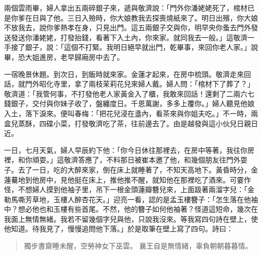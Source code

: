 兩個雲雨畢，婦人拿出五兩碎銀子來，遞與敬濟說：「門外你潘姥姥死了，棺材已是你爹在日與了他。三日入殮時，你大娘教我去探喪燒紙來了。明日出殯，你大娘不放我去，說你爹熱孝在身，只見出門。這五兩銀子交與你，明早央你蚤去門外發送發送你潘姥姥，打發抬錢，看著下入土內，你來家。就同我去一般。」這敬濟一手接了銀子，說：「這個不打緊。我明日絕早就出門，乾畢事，來回你老人家。」說畢，恐大姐進房，老早歸廂房中去了。

一宿晚景休題。到次日，到飯時就來家。金蓮才起來，在房中梳頭。敬濟走來回話，就門外昭化寺里，拿了兩枝茉莉花兒來婦人戴。婦人問：「棺材下了葬了？」敬濟道：「我管何事，不打發他老人家黃金入了櫃，我敢來回話！還剩了二兩六七錢銀子，交付與你妹子收了，盤纏度日。千恩萬謝，多多上覆你。」婦人聽見他娘入土，落下淚來。便叫春梅：「把花兒浸在盞內，看茶來與你姐夫吃。」不一時，兩盒兒蒸酥，四碟小菜，打發敬濟吃了茶，往前邊去了。由是越發與這小伙兒日親日近。

一日，七月天氣，婦人早辰約下他：「你今日休往那裡去，在房中等著，我往你房裡，和你頑耍。」這敬濟答應了，不料那日被崔本邀了他，和幾個朋友往門外耍子。去了一日，吃的大醉來家，倒在床上就睡著了，不知天高地下。黃昏時分，金蓮驀地到他房中，見他挺在床上，推他推不醒，就知他在那裡吃了酒來。可霎作怪，不想婦人摸到他袖子里，吊下一根金頭蓮瓣簪兒來，上面趿著兩溜字兒：「金勒馬嘶芳草地，玉樓人醉杏花天。」迎亮一看，認的是孟玉樓簪子：「怎生落在他袖中？想必他也和玉樓有些首尾。不然，他的簪子如何他袖著？怪道這短命，幾次在我面上無情無緒。我若不留幾個字兒與他，只說我沒來。等我寫四句詩在壁上，使他知道。待我見了，慢慢追問他下落。」於是取筆在壁上寫了四句。詩曰：
\begin{quote}
獨步書齋睡未醒，空勞神女下巫雲。
襄王自是無情緒，辜負朝朝暮暮情。
\end{quote}

